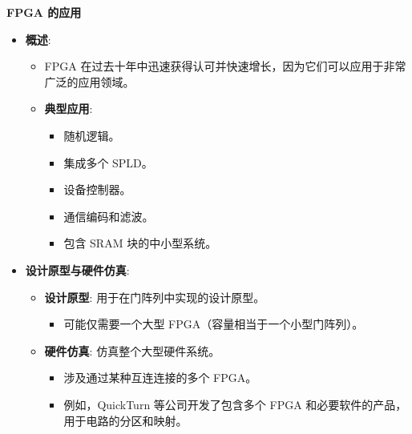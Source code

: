 \begin{frame}
\begin{block}{\textbf{FPGA 的应用}}
\label{fpga-ux7684ux5e94ux7528}
\begin{itemize}
\tightlist
\item
    \textbf{概述}:

    \begin{itemize}
    \tightlist
    \item
    FPGA
    在过去十年中迅速获得认可并快速增长，因为它们可以应用于非常广泛的应用领域。
    \item
    \textbf{典型应用}:

    \begin{itemize}
    \tightlist
    \item
        随机逻辑。
    \item
        集成多个 SPLD。
    \item
        设备控制器。
    \item
        通信编码和滤波。
    \item
        包含 SRAM 块的中小型系统。
    \end{itemize}
    \end{itemize}
\item
    \textbf{设计原型与硬件仿真}:

    \begin{itemize}
    \tightlist
    \item
    \textbf{设计原型}: 用于在门阵列中实现的设计原型。

    \begin{itemize}
    \tightlist
    \item
        可能仅需要一个大型 FPGA（容量相当于一个小型门阵列）。
    \end{itemize}
    \item
    \textbf{硬件仿真}: 仿真整个大型硬件系统。

    \begin{itemize}
    \tightlist
    \item
        涉及通过某种互连连接的多个 FPGA。
    \item
        例如，QuickTurn 等公司开发了包含多个 FPGA
        和必要软件的产品，用于电路的分区和映射。
    \end{itemize}
    \end{itemize}
\end{itemize}
\end{block}
\end{frame}

